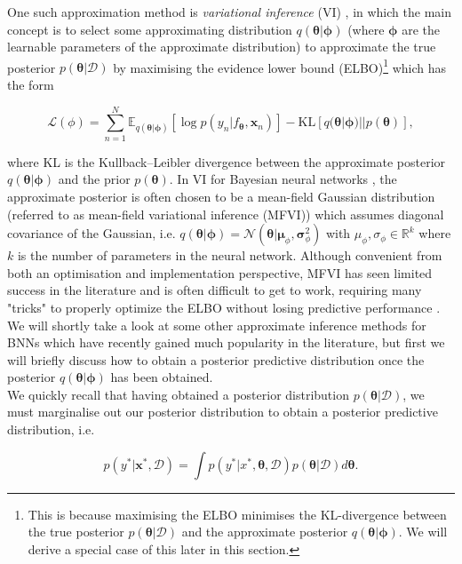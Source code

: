 \noindent One such approximation method is \textit{variational inference} (VI) \citep{1998_JordanVI, 2003_Beal}, in which the main concept is to select some approximating distribution $q(\bm{\theta}|\bm\phi)$ (where $\bm\phi$ are the learnable parameters of the approximate distribution) to approximate the true posterior $p(\bm{\theta}|\mathcal{D})$ by maximising the evidence lower bound (ELBO)\footnote{This is because maximising the ELBO minimises the KL-divergence between the true posterior $p(\bm\theta|\mathcal{D})$ and the approximate posterior $q(\bm\theta|\bm\phi)$. We will derive a special case of this later in this section.}  which has the form

\begin{equation}
    \mathcal{L}(\phi)= \sum^N_{n=1}\mathbb{E}_{q(\bm{\theta}|\bm\phi)}\left[\log p(y_n|f_{\bm{\theta}}, \mathbf{x}_n)\right] - \text{KL}[q(\bm{\theta}|\bm\phi)||p(\bm{\theta})],
\end{equation}

\noindent where KL is the Kullback–Leibler divergence between the approximate posterior $q(\bm{\theta}|\bm\phi)$ and the prior $p(\bm{\theta})$. In VI for Bayesian neural networks \citep{2015_BayesByBack}, the approximate posterior is often chosen to be a mean-field Gaussian distribution (referred to as mean-field variational inference (MFVI)) which assumes diagonal covariance of the Gaussian, i.e. $q(\bm{\theta}|\bm\phi)=\mathcal{N}(\bm{\theta}|\mathbf{\mu}_\phi, \mathbf{\sigma}^2_\phi)$ with $\mu_\phi, \sigma_\phi \in \mathbb{R}^k$ where $k$ is the number of parameters in the neural network. Although convenient from both an optimisation and implementation perspective, MFVI has seen limited success in the literature and is often difficult to get to work, requiring many "tricks" to properly optimize the ELBO without losing predictive performance \citep{2018_WuVI, 2020_FoongMFVI, 2020_radialMFVI}. We will shortly take a look at some other approximate inference methods for BNNs which have recently gained much popularity in the literature, but first we will briefly discuss how to obtain a posterior predictive distribution once the posterior $q(\bm{\theta}|\bm\phi)$ has been obtained. \\

\noindent We quickly recall that having obtained a posterior distribution $p(\bm{\theta}|\mathcal{D})$, we must marginalise out our posterior distribution to obtain a posterior predictive distribution, i.e.

\begin{equation}
    p(y^*|\mathbf{x}^*, \mathcal{D}) = \int p(y^*|x^*, \bm{\theta}, \mathcal{D})p(\bm{\theta}|\mathcal{D})d\bm{\theta}.
\end{equation}

